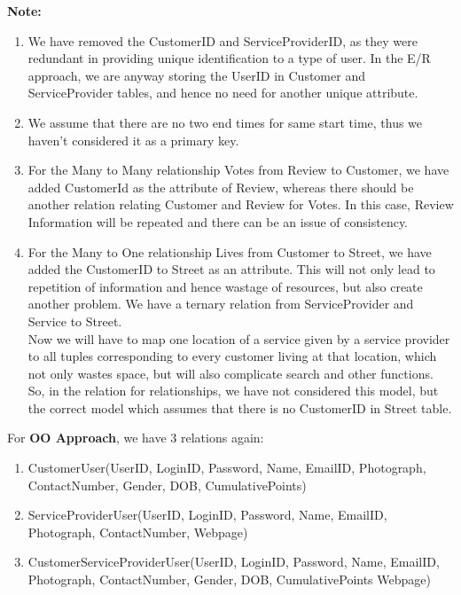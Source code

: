 \documentclass[a4paper]{article}
\begin{document}
\textbf{Note:} 
\begin{enumerate}
\item We have removed the CustomerID and ServiceProviderID, as they were redundant in providing unique identification to a type of user. In the E/R approach, we are anyway storing the UserID in Customer and ServiceProvider tables, and hence no need for another unique attribute.
\item We assume that there are no two end times for same start time, thus we haven't considered it as a primary key.
\item For the Many to Many relationship Votes from Review to Customer, we have added CustomerId as the attribute of Review, whereas there should be another relation relating Customer and Review for Votes. In this case, Review Information will be repeated and there can be an issue of consistency. 
\item For the Many to One relationship Lives from Customer to Street, we have added the CustomerID to Street as an attribute. This will not only lead to repetition of information and hence wastage of resources, but also create another problem. We have a ternary relation from ServiceProvider and Service to Street. \\Now we will have to map one location of a service given by a service provider to all tuples corresponding to every customer living at that location, which not only wastes space, but will also complicate search and other functions. So, in the relation for relationships, we have not considered this model, but the correct model which assumes that there is no CustomerID in Street table.

\end{enumerate}


For \textbf{OO Approach}, we have 3 relations again:

\begin{enumerate}
\item CustomerUser(UserID, LoginID, Password, Name, EmailID, Photograph, ContactNumber, Gender, DOB, CumulativePoints)
\item ServiceProviderUser(UserID, LoginID, Password, Name, EmailID, Photograph, ContactNumber, Webpage)
\item CustomerServiceProviderUser(UserID, LoginID, Password, Name, EmailID, Photograph, ContactNumber, Gender, DOB, CumulativePoints Webpage)

\end{enumerate}
\end{document}
